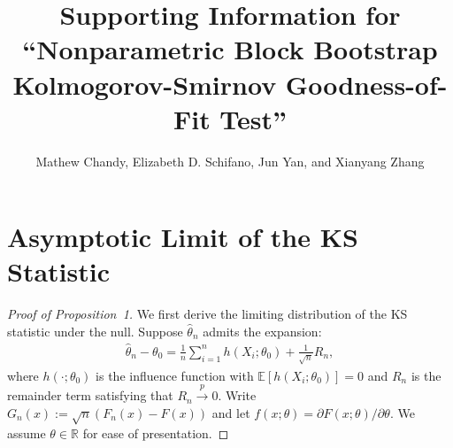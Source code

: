 \documentclass[12pt]{article}
\title{Supporting Information for
  ``Nonparametric Block Bootstrap Kolmogorov-Smirnov Goodness-of-Fit
  Test''}
\author{Mathew Chandy, Elizabeth D. Schifano, Jun Yan, and Xianyang
  Zhang}
\begin{document}
\maketitle


\section{Asymptotic Limit of the KS Statistic}

\begin{proof}[Proof of Proposition~1]
We first derive the limiting distribution of the KS statistic under the null. Suppose $\hat{\theta}_n$ admits the expansion:
\begin{align}\label{eq-expan}
\hat{\theta}_n-\theta_0 = \frac{1}{n}\sum^{n}_{i=1}h(X_i;\theta_0) + \frac{1}{\sqrt{n}}R_n,    
\end{align}
where $h(\cdot;\theta_0)$ is the influence function with $\mathbb{E}[h(X_i;\theta_0)]=0$ and $R_n$ is the remainder term satisfying that
$R_n\overset{p}{\rightarrow} 0.$ Write $G_n(x):=\sqrt{n}(F_n(x)-F(x))$ and let $f(x;\theta)=\partial F(x;\theta)/\partial \theta$. We assume $\theta \in \mathbb{R}$ for ease of presentation.



\end{proof}
\end{document}
